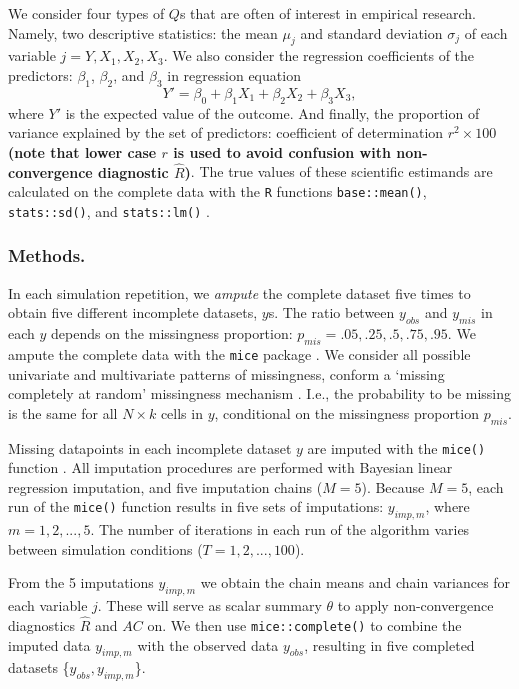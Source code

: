 \documentclass[Royal,times,sageh]{sagej}
\begin{document}
We consider four types of \(Q\)s that are often of interest in empirical
research. Namely, two descriptive statistics: the mean \(\mu_j\) and
standard deviation \(\sigma_j\) of each variable
\(j = Y, X_1, X_2, X_3\). We also consider the regression coefficients
of the predictors: \(\beta_1\), \(\beta_2\), and \(\beta_3\) in
regression equation
\[Y' = \beta_0 + \beta_1 X_1 + \beta_2 X_2 + \beta_3 X_3,\] where \(Y'\)
is the expected value of the outcome. And finally, the proportion of
variance explained by the set of predictors: coefficient of
determination \(r^2 \times 100\) \textbf{(note that lower case \(r\) is
used to avoid confusion with non-convergence diagnostic
\(\widehat{R}\))}. The true values of these scientific estimands are
calculated on the complete data with the \texttt{R} functions
\texttt{base::mean()}, \texttt{stats::sd()}, and \texttt{stats::lm()}
\citep{R}.

\hypertarget{methods.}{%
\subsubsection{Methods.}\label{methods.}}

In each simulation repetition, we \emph{ampute} the complete dataset
five times to obtain five different incomplete datasets, \(y\)s. The
ratio between \(y_{obs}\) and \(y_{mis}\) in each \(y\) depends on the
missingness proportion: \(p_{mis} =.05,.25,.5,.75,.95\). We ampute the
complete data with the \texttt{mice} package \citep[function
\texttt{mice::ampute()};][]{mice}. We consider all possible univariate
and multivariate patterns of missingness, conform a `missing completely
at random' missingness mechanism \citep{rubin87}. I.e., the probability
to be missing is the same for all \(N \times k\) cells in \(y\),
conditional on the missingness proportion \(p_{mis}\).

Missing datapoints in each incomplete dataset \(y\) are imputed with the
\texttt{mice()} function \citep{mice}. All imputation procedures are
performed with Bayesian linear regression imputation, and five
imputation chains (\(M=5\)). Because \(M=5\), each run of the
\texttt{mice()} function results in five sets of imputations:
\(y_{imp,m}\), where \(m = 1, 2, ..., 5\). The number of iterations in
each run of the algorithm varies between simulation conditions
(\(T=1,2,...,100\)).

From the 5 imputations \(y_{imp,m}\) we obtain the chain means and chain
variances for each variable \(j\). These will serve as scalar summary
\(\theta\) to apply non-convergence diagnostics \(\widehat{R}\) and
\(AC\) on. We then use \texttt{mice::complete()} to combine the imputed
data \(y_{imp,m}\) with the observed data \(y_{obs}\), resulting in five
completed datasets \{\(y_{obs}, y_{imp, m}\)\}.
\end{document}
